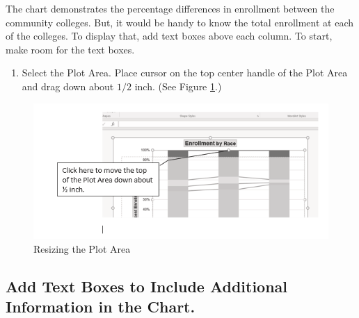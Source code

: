 The chart demonstrates the percentage differences in enrollment between the community colleges. But, it would be handy to know the total enrollment at each of the colleges. To display that, add text boxes above each column. To start, make room for the text boxes.

\begin{enumerate}
	\item Select the Plot Area. Place cursor on the top center handle of the Plot Area and drag down about $ 1/2 $ inch. (See Figure \ref{04:fig41}.)
\end{enumerate}

\begin{figure}[H]
	\centering
	\includegraphics[width=\maxwidth{.95\linewidth}]{gfx/ch04_fig41}
	\caption{Resizing the Plot Area}
	\label{04:fig41}
\end{figure}

\subsection{Add Text Boxes to Include Additional Information in the Chart.}

